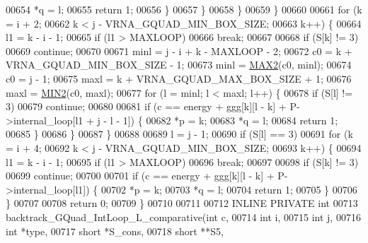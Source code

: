 \begin{DoxyCode}
00654           *q  = l;
00655           \textcolor{keywordflow}{return} 1;
00656         \}
00657       \}
00658     \}
00659   \}
00660 
00661   \textcolor{keywordflow}{for} (k = i + 2;
00662        k < j - VRNA\_GQUAD\_MIN\_BOX\_SIZE;
00663        k++) \{
00664     l1 = k - i - 1;
00665     \textcolor{keywordflow}{if} (l1 > MAXLOOP)
00666       \textcolor{keywordflow}{break};
00667 
00668     \textcolor{keywordflow}{if} (S[k] != 3)
00669       \textcolor{keywordflow}{continue};
00670 
00671     minl  = j - i + k - MAXLOOP - 2;
00672     c0    = k + VRNA\_GQUAD\_MIN\_BOX\_SIZE - 1;
00673     minl  = \hyperlink{group__utils_ga33297b3679c713b0c4d897cd0fe3b122}{MAX2}(c0, minl);
00674     c0    = j - 1;
00675     maxl  = k + VRNA\_GQUAD\_MAX\_BOX\_SIZE + 1;
00676     maxl  = \hyperlink{group__utils_gae0b9cd0ce090bd69b951aa73e8fa4f7d}{MIN2}(c0, maxl);
00677     \textcolor{keywordflow}{for} (l = minl; l < maxl; l++) \{
00678       \textcolor{keywordflow}{if} (S[l] != 3)
00679         \textcolor{keywordflow}{continue};
00680 
00681       \textcolor{keywordflow}{if} (c == energy + ggg[k][l - k] + P->internal\_loop[l1 + j - l - 1]) \{
00682         *p  = k;
00683         *q  = l;
00684         \textcolor{keywordflow}{return} 1;
00685       \}
00686     \}
00687   \}
00688 
00689   l = j - 1;
00690   \textcolor{keywordflow}{if} (S[l] == 3)
00691     \textcolor{keywordflow}{for} (k = i + 4;
00692          k < j - VRNA\_GQUAD\_MIN\_BOX\_SIZE;
00693          k++) \{
00694       l1 = k - i - 1;
00695       \textcolor{keywordflow}{if} (l1 > MAXLOOP)
00696         \textcolor{keywordflow}{break};
00697 
00698       \textcolor{keywordflow}{if} (S[k] != 3)
00699         \textcolor{keywordflow}{continue};
00700 
00701       \textcolor{keywordflow}{if} (c == energy + ggg[k][l - k] + P->internal\_loop[l1]) \{
00702         *p  = k;
00703         *q  = l;
00704         \textcolor{keywordflow}{return} 1;
00705       \}
00706     \}
00707 
00708   \textcolor{keywordflow}{return} 0;
00709 \}
00710 
00711 
00712 INLINE PRIVATE \textcolor{keywordtype}{int}
00713 backtrack\_GQuad\_IntLoop\_L\_comparative(\textcolor{keywordtype}{int}           c,
00714                                       \textcolor{keywordtype}{int}           i,
00715                                       \textcolor{keywordtype}{int}           j,
00716                                       \textcolor{keywordtype}{int}           *type,
00717                                       \textcolor{keywordtype}{short}         *S\_cons,
00718                                       \textcolor{keywordtype}{short}         **S5,

\end{DoxyCode}
